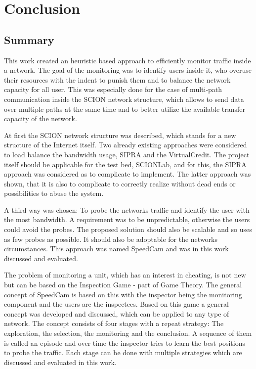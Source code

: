 \documentclass[thesis.tex]{subfiles}
\begin{document}
\chapter{Conclusion}\label{chap:concl}

\section{Summary}
This work created an heuristic based approach to efficiently monitor traffic inside a network. The goal of the monitoring was to identify users inside it, who overuse their resources with the indent to punish them and to balance the network capacity for all user. This was especially done for the case of multi-path communication inside the SCION network structure, which allows to send data over multiple paths at the same time and to better utilize the available transfer capacity of the network. 

At first the SCION network structure was described, which stands for a new structure of the Internet itself. Two already existing approaches were considered to load balance the bandwidth usage, SIPRA and the VirtualCredit. The project itself should be applicable for the test bed, SCIONLab, and for this, the SIPRA approach was considered as to complicate to implement. The latter approach was shown, that it is also to complicate to correctly realize without dead ends or possibilities to abuse the system.

A third way was chosen: To probe the networks traffic and identify the user with the most bandwidth. A requirement was to be unpredictable, otherwise the users could avoid the probes. The proposed solution should also be scalable and so uses as few probes as possible. It should also be adoptable for the networks circumstances. This approach was named SpeedCam and was in this work discussed and evaluated.

The problem of monitoring a unit, which has an interest in cheating, is not new but can be based on the Inspection Game - part of Game Theory. The general concept of SpeedCam is based on this with the inspector being the monitoring component and the users are the inspectees. Based on this game a general concept was developed and discussed, which can be applied to any type of network. The concept consists of four stages with a repeat strategy: The exploration, the selection, the monitoring and the conclusion. A sequence of them is called an episode and over time the inspector tries to learn the best positions to probe the traffic. Each stage can be done with multiple strategies which are discussed and evaluated in this work. 
\end{document}
